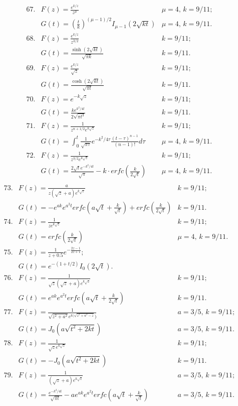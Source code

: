 \documentclass[10pt]{article}
\begin{document}
\[
\begin{array}{llr}
67. & F(z)= \frac{e^{k/z}}{z^{\mu}}&\mu= 4, \, k=9/11; \\[1cm]
  & G(t)= (\frac{t}{k})^{(\mu-1)/2}I_{\mu -1}(2\sqrt{kt})&\mu=4, \, k=9/11.\\[1cm]
68. & F(z)= \frac{e^{k/z}}{z^{3/2}}& k=9/11; \\[1cm]
  & G(t)= \frac{\sinh(2\sqrt{kt})}{\sqrt{\pi k}}& k=9/11.\\[1cm]
69. & F(z)= \frac{e^{k/z}}{\sqrt{z}}&k=9/11; \\[1cm]
  & G(t)= \frac{\cosh(2\sqrt{kt})}{\sqrt{\pi t}}&k=9/11.\\[1cm]
70. & F(z)= e^{-k\sqrt{z}}&k=9/11; \\[1cm]
  & G(t)= \frac{ke^{k^{2}/4t}}{2\sqrt{\pi t^{3}}}&k=9/11.\\[1cm]
71. & F(z)= \frac{1}{z^{n+1/2}e^{k\sqrt{z}}}&k=9/11; \\[1cm]
  & G(t)= \int_0^{t}\frac{1}{\sqrt{\pi \tau}}e^{-k^{2}/4\tau}\frac{(t-\tau)^{n-1}}{(n-1)!}d\tau&\mu=4, \, k=9/11.\\[1cm]
72. & F(z)= \frac{1}{z^{3/2}e^{k\sqrt{z}}}&k=9/11; \\[1cm]
  & G(t)= \frac{2\sqrt{t}e^{-k^{2}/4t}}{\sqrt{\pi}}-k\cdot erfc(\frac{k}{2\sqrt{t}})&\mu=4, \, k=9/11.\\[1cm]
\end{array}
\]
\[
\begin{array}{llr}
73. & F(z)= \frac{a}{z(\sqrt{z}+a)e^{k\sqrt{z}}}&k=9/11; \\[1cm]
  & G(t)= -e^{ak}e^{a^{2}t}erfc\left (a\sqrt{t}+\frac{k}{\sqrt{t}}\right ) + erfc \left ( \frac{k}{2\sqrt{t}}\right ) &k=9/11.\\[1cm]
74. & F(z)= \frac{1}{ze^{k\sqrt{z}}}&k=9/11; \\[1cm]
  & G(t)= erfc(\frac{k}{2\sqrt{t}})&\mu=4, \, k=9/11.\\[1cm]
75. & F(z)= \frac{1}{z+0.5}e^{-\frac{2z-1}{2z+1}};& \\[1cm]
  & G(t)= e^{-(1+t/2)}I_0(2\sqrt{t}).&\\[1cm]
76. & F(z)= \frac{1}{\sqrt{z}(\sqrt{z}+a)e^{k\sqrt{z}}}&k=9/11; \\[1cm]
  & G(t)= e^{ak}e^{a^{2}t}erfc\left (a\sqrt{t}+\frac{k}{2\sqrt{t}}\right )  &k=9/11.\\[1cm]
77. & F(z)= \frac{1}{\sqrt{z^{2}+a^{2}}e^{k(\sqrt{z^{2}+a^{2}-z}})}&a=3/5, \,k=9/11; \\[1cm]
  & G(t)= J_0(a \sqrt{t^{2}+2kt})  &a=3/5, \, k=9/11.\\[1cm]
78. & F(z)= \frac{1}{\sqrt{z}e^{k\sqrt{z}}}&k=9/11; \\[1cm]
  & G(t)= -J_0 (a\sqrt{t^{2}+2kt})  &k=9/11.\\[1cm]
79. & F(z)= \frac{1}{(\sqrt{z}+a)e^{k\sqrt{z}}}&a=3/5, \, k=9/11; \\[1cm]
  & G(t)= \frac{e^{-k^{2}/4t}}{\sqrt{\pi t}}-ae^{ak}e^{a^{2}t}erfc\left (a\sqrt{t}+\frac{k}{\sqrt{t}}\right )  &a=3/5, \, k=9/11.\\[1cm]
\end{array}
\]
\end{document}
